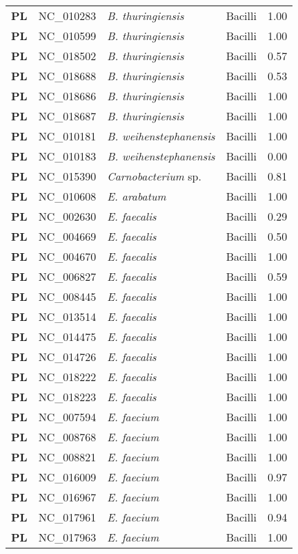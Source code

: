 \begin{adjustwidth}{-3cm}{2cm}
{\begin{supertabular}{>{\bfseries}l|p{0.1\textwidth}p{0.14\textwidth}l|l}
PL & NC\_010283 & \textit{B. thuringiensis} & Bacilli & 1.00\\
PL & NC\_010599 & \textit{B. thuringiensis} & Bacilli & 1.00\\
PL & NC\_018502 & \textit{B. thuringiensis} & Bacilli & 0.57\\
PL & NC\_018688 & \textit{B. thuringiensis} & Bacilli & 0.53\\
PL & NC\_018686 & \textit{B. thuringiensis} & Bacilli & 1.00\\
PL & NC\_018687 & \textit{B. thuringiensis} & Bacilli & 1.00\\
PL & NC\_010181 & \textit{B. weihenstephanensis} & Bacilli & 1.00\\
PL & NC\_010183 & \textit{B. weihenstephanensis} & Bacilli & 0.00\\
PL & NC\_015390 & \textit{Carnobacterium} sp. & Bacilli & 0.81\\
PL & NC\_010608 & \textit{E. arabatum} & Bacilli & 1.00\\
PL & NC\_002630 & \textit{E. faecalis} & Bacilli & 0.29\\
PL & NC\_004669 & \textit{E. faecalis} & Bacilli & 0.50\\
PL & NC\_004670 & \textit{E. faecalis} & Bacilli & 1.00\\
PL & NC\_006827 & \textit{E. faecalis} & Bacilli & 0.59\\
PL & NC\_008445 & \textit{E. faecalis} & Bacilli & 1.00\\
PL & NC\_013514 & \textit{E. faecalis} & Bacilli & 1.00\\
PL & NC\_014475 & \textit{E. faecalis} & Bacilli & 1.00\\
PL & NC\_014726 & \textit{E. faecalis} & Bacilli & 1.00\\
PL & NC\_018222 & \textit{E. faecalis} & Bacilli & 1.00\\
PL & NC\_018223 & \textit{E. faecalis} & Bacilli & 1.00\\
PL & NC\_007594 & \textit{E. faecium} & Bacilli & 1.00\\
PL & NC\_008768 & \textit{E. faecium} & Bacilli & 1.00\\
PL & NC\_008821 & \textit{E. faecium} & Bacilli & 1.00\\
PL & NC\_016009 & \textit{E. faecium} & Bacilli & 0.97\\
PL & NC\_016967 & \textit{E. faecium} & Bacilli & 1.00\\
PL & NC\_017961 & \textit{E. faecium} & Bacilli & 0.94\\
PL & NC\_017963 & \textit{E. faecium} & Bacilli & 1.00\\

\end{supertabular}}
\end{adjustwidth}
